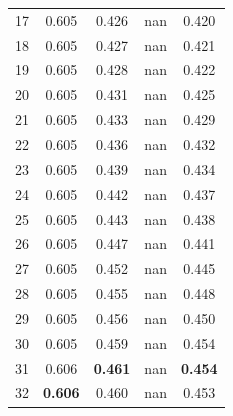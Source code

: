 \documentclass[11pt,a4paper]{article}
\begin{document}
\begin{table}[H]
\begin{tabular}{rcccc}
17 & 0.605 & 0.426 & nan & 0.420 \\

18 & 0.605 & 0.427 & nan & 0.421 \\

19 & 0.605 & 0.428 & nan & 0.422 \\

20 & 0.605 & 0.431 & nan & 0.425 \\

21 & 0.605 & 0.433 & nan & 0.429 \\

22 & 0.605 & 0.436 & nan & 0.432 \\

23 & 0.605 & 0.439 & nan & 0.434 \\

24 & 0.605 & 0.442 & nan & 0.437 \\

25 & 0.605 & 0.443 & nan & 0.438 \\

26 & 0.605 & 0.447 & nan & 0.441 \\

27 & 0.605 & 0.452 & nan & 0.445 \\

28 & 0.605 & 0.455 & nan & 0.448 \\

29 & 0.605 & 0.456 & nan & 0.450 \\

30 & 0.605 & 0.459 & nan & 0.454 \\

31 & 0.606 & \textbf{0.461} & nan & \textbf{0.454} \\

32 & \textbf{0.606} & 0.460 & nan & 0.453 \\

\bottomrule

\end{tabular}

\end{table}
\end{document}
